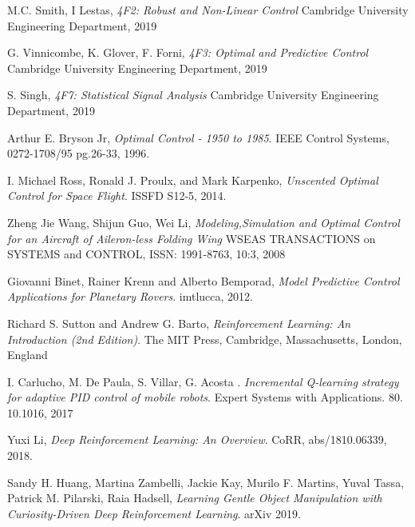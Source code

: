 \documentclass[../main.tex]{subfiles}
\begin{document}
\renewcommand{\bibname}{References}
\begin{thebibliography}{9}
        M.C. Smith, I Lestas,
        \emph{4F2: Robust and Non-Linear Control}
        Cambridge University Engineering Department, 2019

        G. Vinnicombe, K. Glover, F. Forni,
        \emph{4F3: Optimal and Predictive Control}
        Cambridge University Engineering Department, 2019

        S. Singh,
        \emph{4F7: Statistical Signal Analysis}
        Cambridge University Engineering Department, 2019

        Arthur E. Bryson Jr,
        \emph{Optimal Control - 1950 to 1985}.
        IEEE Control Systems, 0272-1708/95 pg.26-33, 1996.

        I. Michael Ross, Ronald J. Proulx, and Mark Karpenko,
        \emph{Unscented Optimal Control for Space Flight}.
        ISSFD S12-5, 2014.

        Zheng Jie Wang, Shijun Guo, Wei Li,
        \emph{Modeling,Simulation and Optimal Control for an Aircraft of
        Aileron-less Folding Wing}
        WSEAS TRANSACTIONS on SYSTEMS and CONTROL, ISSN: 1991-8763, 10:3, 2008

        Giovanni Binet, Rainer Krenn and Alberto Bemporad,
        \emph{Model Predictive Control Applications for Planetary Rovers}.
        imtlucca, 2012.

        Richard S. Sutton and Andrew G. Barto,
        \emph{Reinforcement Learning: An Introduction (2nd Edition)}.
        The MIT Press, Cambridge, Massachusetts, London, England

        I. Carlucho, M. De Paula, S. Villar, G. Acosta . \emph{Incremental Q-learning strategy for adaptive PID control of mobile robots}. 
        Expert Systems with Applications. 80. 10.1016, 2017

        Yuxi Li, 
        \emph{Deep Reinforcement Learning: An Overview}. 
        CoRR, abs/1810.06339, 2018.
    
        Sandy H. Huang, Martina Zambelli, Jackie Kay, Murilo F. Martins, Yuval Tassa, Patrick M. Pilarski, Raia Hadsell,
        \emph{Learning Gentle Object Manipulation with Curiosity-Driven Deep Reinforcement Learning}.
        arXiv 2019.


\end{thebibliography}
\end{document}
